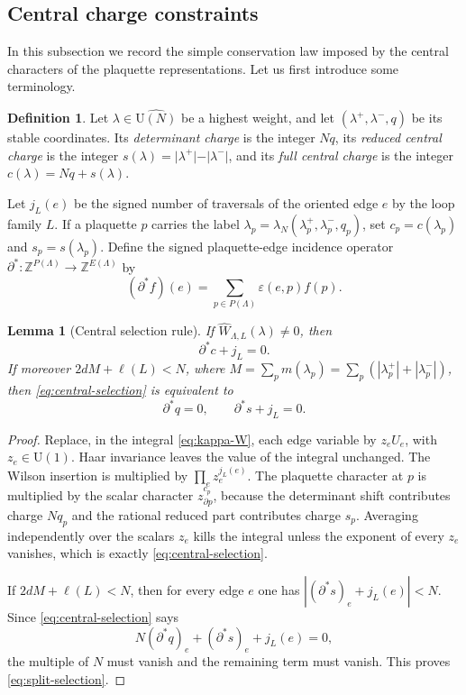 \documentclass[11pt,a4paper,reqno]{amsart}
\newtheorem{lemma}[theorem]{Lemma}
\theoremstyle{definition}
\newtheorem{definition}[theorem]{Definition}
\theoremstyle{remark}
\newcommand\U{{\mathrm U}}
\newcommand\Z{{\mathbb{Z}}}
\begin{document}
\subsection{Central charge constraints}

In this subsection we record the simple conservation law imposed by the central characters of the plaquette representations. Let us first introduce some terminology.

\begin{definition}
Let $\lambda\in\widehat{\U(N)}$ be a highest weight, and let $(\lambda^+,\lambda^-,q)$ be its stable coordinates. Its \emph{determinant charge} is the integer $Nq$, its \emph{reduced central charge} is the integer $s(\lambda)=\vert\lambda^+\vert-\vert\lambda^-\vert$, and its \emph{full central charge} is the integer $c(\lambda)=Nq+s(\lambda).$
\end{definition}

Let $j_L(e)$ be the signed number of traversals of the oriented edge $e$ by the loop family $L$.  If a plaquette $p$ carries the label $\lambda_p=\lambda_N(\lambda_p^+,\lambda_p^-,q_p)$, set $c_p=c(\lambda_p)$ and $s_p=s(\lambda_p)$. Define the signed plaquette-edge incidence operator $\partial^*:\Z^{P(\Lambda)} \longrightarrow \Z^{E(\Lambda)}$ by
\[
(\partial^*f)(e)=\sum_{p\in P(\Lambda)}\varepsilon(e,p)f(p).
\]

\begin{lemma}[Central selection rule]\label{lem:central-selection}
If $\widehat W_{\Lambda,L}(\lambda)\neq0$, then
\begin{equation}\label{eq:central-selection}
\partial^*c+j_L=0.
\end{equation}
If moreover $2dM+\ell(L)<N$, where $M=\sum_p m(\lambda_p)=\sum_p(|\lambda_p^+|+|\lambda_p^-|)$, then \eqref{eq:central-selection} is equivalent to
\begin{equation}\label{eq:split-selection}
\partial^*q=0,
\qquad
\partial^*s+j_L=0.
\end{equation}
\end{lemma}

\begin{proof}
Replace, in the integral \eqref{eq:kappa-W}, each edge variable by $z_eU_e$, with $z_e\in\U(1)$.  Haar invariance leaves the value of the integral unchanged.  The Wilson insertion is multiplied by $\prod_e z_e^{j_L(e)}$.  The plaquette character at $p$ is multiplied by the scalar character $z_{\partial p}^{c_p}$, because the determinant shift contributes charge $Nq_p$ and the rational reduced part contributes charge $s_p$.  Averaging independently over the scalars $z_e$ kills the integral unless the exponent of every $z_e$ vanishes, which is exactly \eqref{eq:central-selection}.

If $2dM+\ell(L)<N$, then for every edge $e$ one has $| (\partial^*s)_e+j_L(e)|<N$.  Since \eqref{eq:central-selection} says
\[
N(\partial^*q)_e+(\partial^*s)_e+j_L(e)=0,
\]
the multiple of $N$ must vanish and the remaining term must vanish.  This proves \eqref{eq:split-selection}.
\end{proof}
\end{document}

